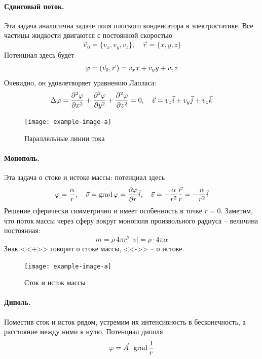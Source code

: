 \paragraph{Сдвиговый поток.} Эта задача аналогична задаче поля плоского конденсатора в электростатике. Все частицы жидкости двигаются с постоянной скоростью
\begin{equation}
    \vec{v}_0 = \{v_x, v_y, v_z\}, \quad
    \vec{r} = \{x,y,z\}
\end{equation}
Потенциал здесь будет
\begin{equation}
    \varphi = \qty(\vec{v}_0,\vec{r}\,) = v_x x + v_y y + v_z z
\end{equation}
Очевидно, он удовлетворяет уравнению Лапласа:
\begin{equation}
    \Delta \varphi = \pdv[2]{\varphi}{x}+ \pdv[2]{\varphi}{y} + \pdv[2]{\varphi}{z}=0, \quad
    \vec{v} = v_x \vec{i} + v_y \vec{j} + v_z \vec{k}
\end{equation}
\begin{figure}[H]
    \centering
    \texttt{[image: example-image-a]}
    \caption{Параллельные линии тока}
    \label{fig:sdvigovuipotok}
\end{figure}

\paragraph{Монополь.} Эта задача о стоке и истоке массы: потенциал здесь
\begin{equation}
    \varphi = \frac{\alpha}{r}, \quad \vec{v} = \operatorname{grad} \varphi = \pdv{\varphi}{r} \vec{i}, \quad \vec{v} = -\frac{\alpha}{r^2}  \frac{\vec{r}}{r} = 
    -\frac{\alpha}{r^2} \vec{i}
\end{equation}
Решение сферически симметрично и имеет особенность в точке $r=0$. Заметим, что поток массы через сферу вокруг монополя произвольного радиуса -- величина постоянная:
\begin{equation}
    m = \rho\, 4\pi r^2\, |v| = \rho\cdot 4\pi\alpha
\end{equation}
Знак <<+>> говорит о стоке массы, <<->> -- о истоке.
\begin{figure}[H]
    \centering
    \texttt{[image: example-image-a]}
    \caption{Сток и исток массы}
    \label{fig:stokistok}
\end{figure}

\paragraph{Диполь.} Поместив сток и исток рядом, устремим их интенсивность в бесконечность, а расстояние между ними к нулю. Потенциал диполя
\begin{equation}
    \varphi = \vec{A} \cdot \operatorname{grad} \frac{1}{r}
\end{equation}

